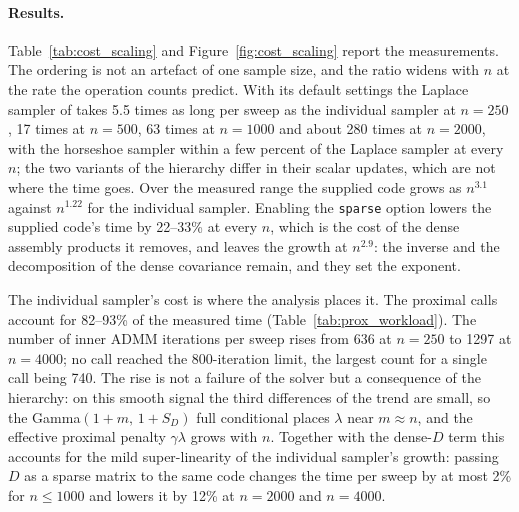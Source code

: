 \paragraph{Results.} Table~\ref{tab:cost_scaling} and Figure~\ref{fig:cost_scaling} report the measurements. The ordering is not an artefact of one sample size, and the ratio widens with $n$ at the rate the operation counts predict. With its default settings the Laplace sampler of \citet{onizuka2024fast} takes 5.5 times as long per sweep as the individual sampler at $n = 250$, 17 times at $n = 500$, 63 times at $n = 1000$ and about 280 times at $n = 2000$, with the horseshoe sampler within a few percent of the Laplace sampler at every $n$; the two variants of the hierarchy differ in their scalar updates, which are not where the time goes. Over the measured range the supplied code grows as $n^{3.1}$ against $n^{1.22}$ for the individual sampler. Enabling the \texttt{sparse} option lowers the supplied code's time by 22--33\% at every $n$, which is the cost of the dense assembly products it removes, and leaves the growth at $n^{2.9}$: the inverse and the decomposition of the dense covariance remain, and they set the exponent.

The individual sampler's cost is where the analysis places it. The proximal calls account for 82--93\% of the measured time (Table~\ref{tab:prox_workload}). The number of inner ADMM iterations per sweep rises from 636 at $n = 250$ to 1297 at $n = 4000$; no call reached the $800$-iteration limit, the largest count for a single call being 740. The rise is not a failure of the solver but a consequence of the hierarchy: on this smooth signal the third differences of the trend are small, so the Gamma$(1 + m,\, 1 + S_D)$ full conditional places $\lambda$ near $m \approx n$, and the effective proximal penalty $\gamma\lambda$ grows with $n$. Together with the dense-$D$ term this accounts for the mild super-linearity of the individual sampler's growth: passing $D$ as a sparse matrix to the same code changes the time per sweep by at most 2\% for $n \le 1000$ and lowers it by 12\% at $n = 2000$ and $n = 4000$.

